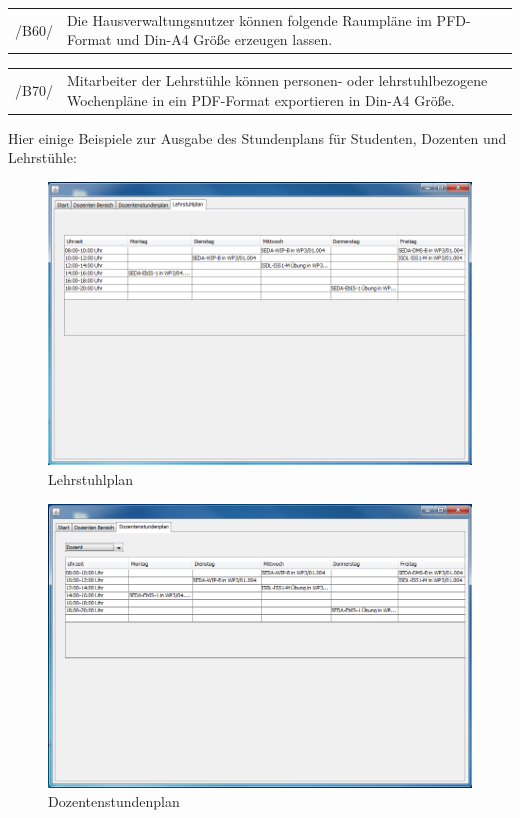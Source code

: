 \begin{tabular}{p{1.5cm}p{14.5cm}}
 /B60/	& Die Hausverwaltungsnutzer können folgende Raumpläne im PFD-Format und Din-A4 Größe erzeugen lassen. \\[0.25cm]	 
\end{tabular}

\begin{tabular}{p{1.5cm}p{14.5cm}}
 /B70/	& Mitarbeiter der Lehrstühle können personen- oder lehrstuhlbezogene Wochenpläne in ein PDF-Format exportieren in Din-A4 Größe. \\[0.25cm]	 
\end{tabular}

Hier einige Beispiele zur Ausgabe des Stundenplans für Studenten, Dozenten und Lehrstühle:
\begin{figure}[H]
\begin{center}
\includegraphics[width=170mm]{images/section_7/DozentenLehrstuhlplan.PNG}
\caption{Lehrstuhlplan}
\label{img:LehrstuhlplanDoz}
\end{center}
\end{figure}

\begin{figure}[H]
\begin{center}
\includegraphics[width=170mm]{images/section_7/DozentenStundenplan.PNG}
\caption{Dozentenstundenplan}
\label{img:StundenplanDoz}
\end{center}
\end{figure}

